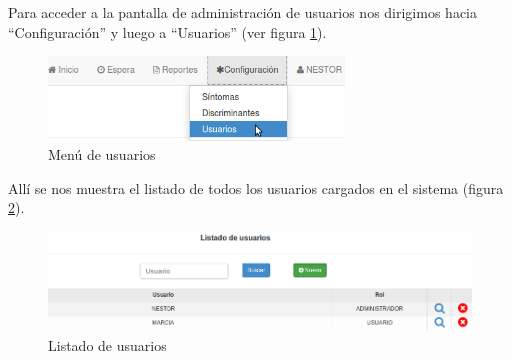 \label{ABM_usuarios}
Para acceder a la pantalla de administración de usuarios nos dirigimos hacia ``Configuración'' y luego a ``Usuarios'' (ver figura \ref{fig:menu_usuarios}).
\begin{figure}
\centerline{\includegraphics[width=0.7\textwidth]{menu_usuarios.png}}
\caption{Menú de usuarios}
\label{fig:menu_usuarios}
\end{figure}
Allí se nos muestra el listado de todos los usuarios cargados en el sistema (figura \ref{fig:listado_usuarios}).
\begin{figure}
\centerline{\includegraphics[width=1\textwidth]{listado_usuarios.png}}
\caption{Listado de usuarios}
\label{fig:listado_usuarios}
\end{figure}

